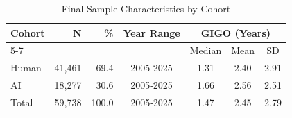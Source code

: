 \begin{table}[htbp]
\centering
\caption{Final Sample Characteristics by Cohort}
\label{tab:cohort_characteristics}
\begin{tabular}{lrrcccc}
\toprule
Cohort & N & \% & Year Range & \multicolumn{3}{c}{GIGO (Years)} \\
\cmidrule(lr){5-7}
 & & & & Median & Mean & SD \\
\midrule
Human & 41,461 & 69.4 & 2005-2025 & 1.31 & 2.40 & 2.91 \\
AI & 18,277 & 30.6 & 2005-2025 & 1.66 & 2.56 & 2.51 \\
\midrule
Total & 59,738 & 100.0 & 2005-2025 & 1.47 & 2.45 & 2.79 \\
\bottomrule
\end{tabular}
\end{table}